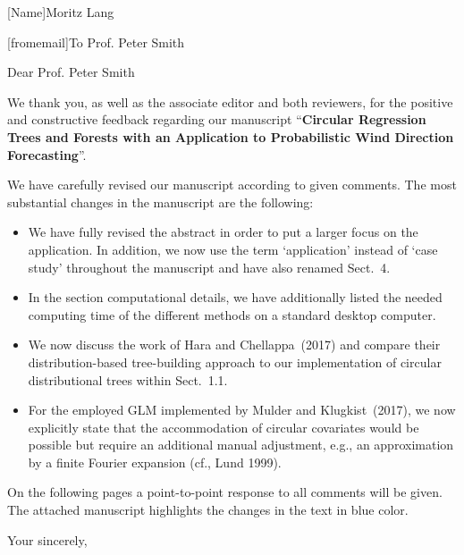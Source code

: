 \documentclass[english, noconfig]{uibklttr}
\begin{document}

[Name]{Moritz Lang}





\begin{letter}[fromemail]{To Prof. Peter Smith}
\opening{Dear Prof. Peter Smith}

We thank you, as well as the associate editor and both reviewers, for the
positive and constructive feedback regarding our manuscript ``\textbf{Circular
Regression Trees and Forests with an Application to Probabilistic Wind
Direction Forecasting}''.

\vspace{5mm}

We have carefully revised our manuscript according to given comments.
The most substantial changes in the manuscript are the following:

\begin{itemize}
\item We have fully revised the abstract in order to put a larger
focus on the application. In addition, we now use the term `application' 
instead of `case study' throughout the manuscript and have also renamed Sect.~4.
 
\item In the section computational details, we have additionally listed the needed
computing time of the different methods on a standard desktop computer. 

\item We now discuss the work of Hara and Chellappa~(2017) and compare their distribution-based 
tree-building approach to our implementation of circular distributional trees within Sect.~1.1.

\item For the employed GLM implemented by Mulder and Klugkist~(2017), we now
explicitly state that the accommodation of circular covariates would be possible
but require an additional manual adjustment, e.g., an approximation by a finite
Fourier expansion (cf., Lund 1999).

\end{itemize}

\vspace{5mm}

On the following pages a point-to-point response to all comments will be given.
The attached manuscript highlights the changes in the text in blue color.

\closing{Your sincerely,}

\end{letter}
\end{document}

